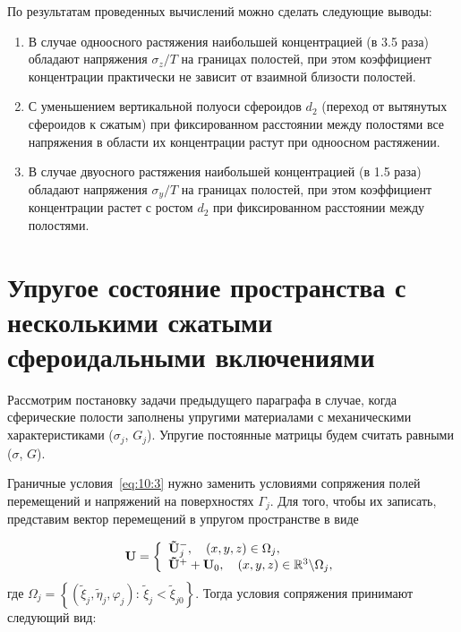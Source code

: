 По результатам проведенных вычислений можно сделать следующие выводы:
\begin{enumerate}
\item В случае одноосного растяжения наибольшей концентрацией (в 3.5 раза) обладают напряжения $\sigma_z/T$ на границах полостей, при этом коэффициент концентрации практически не зависит от взаимной близости полостей.
\item С уменьшением вертикальной полуоси сфероидов $d_2$ (переход от вытянутых сфероидов к сжатым) при фиксированном расстоянии между полостями все напряжения в области их концентрации растут при одноосном растяжении.
\item В случае двуосного растяжения наибольшей концентрацией (в 1.5 раза) обладают напряжения $\sigma_y/T$ на границах полостей, при этом коэффициент концентрации растет с ростом $d_2$ при фиксированном расстоянии между полостями.
\end{enumerate}

\section[Упругое состояние пространства с несколькими сжатыми сфероидальными включениями]{Упругое состояние пространства с несколькими сжатыми сфероидальными включениями}

Рассмотрим постановку задачи предыдущего параграфа в случае, когда сферические полости заполнены упругими материалами с механическими характеристиками ($\sigma_j$, $G_j$). Упругие постоянные матрицы будем считать равными ($\sigma$, $G$).

Граничные условия~\eqref{eq:10:3} нужно заменить условиями сопряжения полей перемещений и напряжений на поверхностях $\Gamma_j$. Для того, чтобы их записать, представим вектор перемещений в упругом пространстве в виде

\begin{equation}
{\bf{U}} = \left\{ {\begin{array}{*{20}{l}}
{{\bf{\tilde U}}_j^ - ,\quad \left( {x,y,z} \right) \in {\Omega _j},}\\
{{{{\bf{\tilde U}}}^ + } + {{\bf{U}}_0},\quad \left( {x,y,z} \right) \in\mathbb{R}^3\backslash {\Omega _j},}
\end{array}} \right.
\label{eq:10:11}
\end{equation}
где ${\Omega _j} = \left\{ {\left( {{{\tilde \xi }_j},{{\tilde \eta }_j},{\varphi _j}} \right):\,{{\tilde \xi }_j} < {{\tilde \xi }_{j0}}} \right\}$. Тогда условия сопряжения принимают следующий вид:

